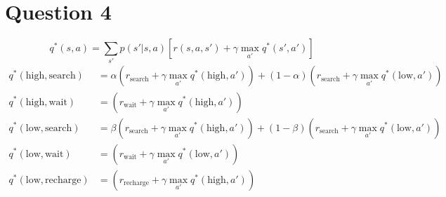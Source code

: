 \newpage
\section{Question 4}
\begin{equation}
  \label{eq:q4}
  q^*(s,a) = \sum_{s'} p(s'|s,a) \left[ r(s,a,s') + \gamma \max_{a'} q^*(s',a') \right]
\end{equation}
\begin{align*}
    q^*(\text{high}, \text{search}) &= \alpha(r_{\text{search}} + \gamma \max_{a'} q^*(\text{high},a')) + (1-\alpha)(r_{\text{search}} + \gamma \max_{a'} q^*(\text{low},a')) \\
    q^*(\text{high}, \text{wait}) &= (r_{\text{wait}} + \gamma \max_{a'} q^*(\text{high},a'))  \\
    q^*(\text{low}, \text{search}) &= \beta(r_{\text{search}} + \gamma \max_{a'} q^*(\text{high},a')) + (1-\beta)(r_{\text{search}} + \gamma \max_{a'} q^*(\text{low},a')) \\
    q^*(\text{low}, \text{wait}) &= (r_{\text{wait}} + \gamma \max_{a'} q^*(\text{low},a'))  \\
    q^*(\text{low}, \text{recharge}) &= (r_{\text{recharge}} + \gamma \max_{a'} q^*(\text{high},a'))  
\end{align*}
